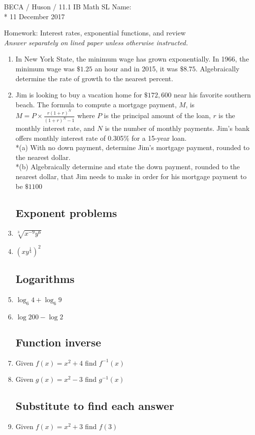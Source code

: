 \documentclass{book}
\begin{document}
\noindent BECA / Huson / 11.1 IB Math SL \hspace{2in} Name:\\*
11 December 2017
\begin{center}
{\Large Homework: Interest rates, exponential functions, and review}\\
\textit{Answer separately on lined paper unless otherwise instructed.}
\end{center}

\begin{enumerate}
\subsection*{Financial models with exponential growth}
\item In New York State, the minimum wage has grown exponentially. In 1966, the minimum wage was $\$1.25$ an hour and in 2015, it was $\$8.75$. Algebraically determine the rate of growth to the nearest percent.
\item Jim is looking to buy a vacation home for $\$172,600$ near his favorite southern beach. The formula to compute a mortgage payment, $M$, is $M=P \times \frac{r(1+r)^N}{(1+r)^N -1}$ where $P$ is the principal amount of the loan, $r$ is the monthly interest rate, and $N$ is the number of monthly payments. Jim's bank offers monthly interest rate of 0.305\% for a 15-year loan.\\*(a) With no down payment, determine Jim's mortgage payment, rounded to the nearest dollar.\\*(b) Algebraically determine and state the down payment, rounded to the nearest dollar, that Jim needs to make in order for his mortgage payment to be $\$1100$
\subsection*{Exponent problems}
\item $\sqrt[3]{x^{-9} y^{6}}$
\item $\displaystyle \left( x y^{\frac{1}{4}}\right)^2$
\subsection*{Logarithms}
\item $\log_6 4 + \log_6 9$
\item $\log 200 - \log 2$
\subsection*{Function inverse}
\item Given $f(x)=x^2+4$ find $f^{-1}(x)$
\item Given $g(x)=x^2-3$ find $g^{-1}(x)$
\subsection*{Substitute to find each answer}
\item Given $f(x) = x^2+3$ find $f(3)$
\end{enumerate}
\end{document}
